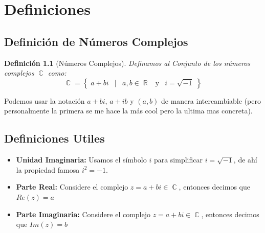 \documentclass[12pt, fleqn]{report}                             %
\DeclareMathOperator \Space     {\quad}                         %
\DeclareMathOperator \MiniSpace {\;}                            %
\newcommand \Such           {\MiniSpace | \MiniSpace}           %
\newcommand \Also           {\MiniSpace \text{y} \MiniSpace}    %
\newtheorem{Definition}     {Definición}[section]               %
\theoremstyle{break}                                            %
\DeclareMathOperator \Reals        {\mathbb{R}}                 %
\DeclareMathOperator \Complexs     {\mathbb{C}}                 %
\newcommand{\Set}[1]            {\left\{ \; #1 \; \right\}}     %
\begin{document}
    \chapter{Definiciones}

        \clearpage
        \section{Definición de Números Complejos}

            \begin{Definition}[Números Complejos]
            \label{NumerosComplejos}
                Definamos al Conjunto de los números complejos $\Complexs$ como:
                \begin{equation}
                    \Complexs = 
                        \Set{ a + bi \Such a,b \in \Reals \Also i = \sqrt{-1} }
                \end{equation}

            \end{Definition}


            Podemos usar la notación $a+bi$, $a+ib$ y $(a, b)$ de manera intercambiable (pero personalmente 
            la primera se me hace la más cool pero la ultima mas concreta).


        \section{Definiciones Utiles} 

            \begin{itemize}
                \item \textbf{Unidad Imaginaria:}
                    Usamos el símbolo $i$ para simplificar $i = \sqrt{-1}$, de ahí la propiedad
                    famosa $i^2 = -1$.

                \item \textbf{Parte Real:}
                    Considere el complejo $z = a+bi \in \Complexs$, entonces decimos que $Re(z) = a$

                \item \textbf{Parte Imaginaria:}
                    Considere el complejo $z = a+bi \in \Complexs$, entonces decimos que $Im(z) = b$
            \end{itemize}
\end{document}
